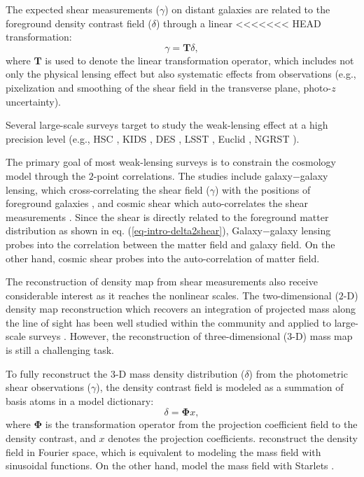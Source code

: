 \documentclass[twocolumn]{aastex63}
\begin{document}
The expected shear measurements ($\gamma$) on distant galaxies are related to
the foreground density contrast field ($\delta$) through a linear
<<<<<<< HEAD
transformation:
\begin{equation} \label{eq-intro-delta2shear}
    \gamma=\mathbf{T} \delta,
\end{equation}
where $\mathbf{T}$ is used to denote the linear transformation operator, which
includes not only the physical lensing effect but also systematic effects from
observations (e.g., pixelization and smoothing of the shear field in the
transverse plane, photo-$z$ uncertainty).

Several large-scale surveys target to study the weak-lensing effect at a high
precision level (e.g., HSC \citep{HSC1-data}, KIDS \citep{KIDS13}, DES
\citep{DES05}, LSST \citep{LSSTScienceBook}, Euclid \citep{Euclid2011}, NGRST
\citep{WFIRST15}).

The primary goal of most weak-lensing surveys is to constrain the cosmology
model through the $2$-point correlations. The studies include galaxy$-$galaxy
lensing, which cross-correlating the shear field ($\gamma$) with the positions
of foreground galaxies
\citep{gglens-GAMA-Han2014,gglens-BossCFHTMore2015,gglens-DES1}, and cosmic
shear which auto-correlates the shear measurements
\citep{cosmicShearRealKids450,cosmicShear-DES1,cosmicShear_HSC1_Chiaki2019,cosmicShear_HSC1_Hamana2019}.
Since the shear is directly related to the foreground matter distribution as
shown in eq. (\ref{eq-intro-delta2shear}), Galaxy$-$galaxy lensing probes into
the correlation between the matter field and galaxy field. On the other hand,
cosmic shear probes into the auto-correlation of matter field.

The reconstruction of density map from shear measurements also receive
considerable interest as it reaches the nonlinear scales. The two-dimensional
($2$-D) density map reconstruction which recovers an integration of projected
mass along the line of sight has been well studied within the community
\citep{massMap-KS1993,WL-massMap-Glimpse2D-Lanusse2016,sparseBaysianMassMap-Price2020}
and applied to large-scale surveys
\citep{HSC1-massMaps,massMapDES-Chang2018,DES-SV-massMap-sparsity}. However,
the reconstruction of three-dimensional ($3$-D) mass map is still a challenging
task.

To fully reconstruct the $3$-D mass density distribution ($\delta$) from the
photometric shear observations ($\gamma$), the density contrast field is
modeled as a summation of basis atoms in a model dictionary:
\begin{equation} \label{eq-intro-dict}
 \delta= \mathbf{\Phi} x,
\end{equation}
where $\mathbf{\Phi}$ is the transformation operator from the projection
coefficient field to the density contrast, and $x$ denotes the projection
coefficients. \citet{LSS-massMap-Wiener-Simon2009} reconstruct the density
field in Fourier space, which is equivalent to modeling the mass field with
sinusoidal functions.  On the other hand,
\citet{LSS-massMap-Glimpse3D-Leonard2014} model the mass field with Starlets
\citep{Starlet-Starck2015}.
\end{document}
